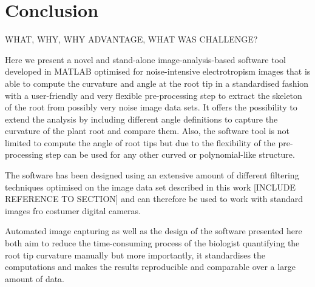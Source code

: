 
\chapter{Conclusion} %

\label{conclusion} %

%


WHAT, WHY, WHY ADVANTAGE, WHAT WAS CHALLENGE?



Here we present a novel and stand-alone image-analysis-based software tool developed in MATLAB optimised for noise-intensive electrotropism images that is able to compute the curvature and angle at the root tip in a standardised fashion with a user-friendly and very flexible pre-processing step to extract the skeleton of the root from possibly very noise image data sets. 
It offers the possibility to extend the analysis by including different angle definitions to capture the curvature of the plant root and compare them. Also, the software tool is not limited to compute the angle of root tips but due to the flexibility of the pre-processing step can be used for any other curved or polynomial-like structure. 

The software has been designed using an extensive amount of different filtering techniques optimised on the image data set described in this work [INCLUDE REFERENCE TO SECTION] and can therefore be used to work with standard images fro costumer digital cameras. 

Automated image capturing as well as the design of the software presented here both aim to reduce the time-consuming process of the biologist quantifying the root tip curvature manually but more importantly, it standardises the computations and makes the results reproducible and comparable over a large amount of data. 

